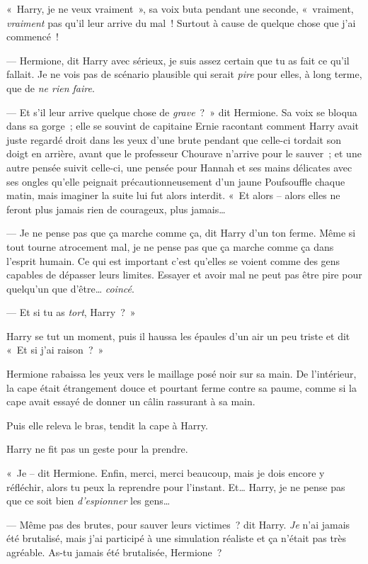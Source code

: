 «~Harry, je ne veux vraiment~», sa voix buta pendant une seconde, «~vraiment, \emph{vraiment} pas qu'il leur arrive du mal~! Surtout à cause de quelque chose que j'ai commencé~!

--- Hermione, dit Harry avec sérieux, je suis assez certain que tu as fait ce qu'il fallait. Je ne vois pas de scénario plausible qui serait \emph{pire} pour elles, à long terme, que de \emph{ne rien faire}.

--- Et s'il leur arrive quelque chose de \emph{grave}~?~» dit Hermione. Sa voix se bloqua dans sa gorge~; elle se souvint de capitaine Ernie racontant comment Harry avait juste regardé droit dans les yeux d'une brute pendant que celle-ci tordait son doigt en arrière, avant que le professeur Chourave n'arrive pour le sauver~; et une autre pensée suivit celle-ci, une pensée pour Hannah et ses mains délicates avec ses ongles qu'elle peignait précautionneusement d'un jaune Poufsouffle chaque matin, mais imaginer la suite lui fut alors interdit. «~Et alors -- alors elles ne feront plus jamais rien de courageux, plus jamais…

--- Je ne pense pas que ça marche comme ça, dit Harry d'un ton ferme. Même si tout tourne atrocement mal, je ne pense pas que ça marche comme ça dans l'esprit humain. Ce qui est important c'est qu'elles se voient comme des gens capables de dépasser leurs limites. Essayer et avoir mal ne peut pas être pire pour quelqu'un que d'être… \emph{coincé}.

--- Et si tu as \emph{tort}, Harry~?~»

Harry se tut un moment, puis il haussa les épaules d'un air un peu triste et dit «~Et si j'ai raison~?~»

Hermione rabaissa les yeux vers le maillage posé noir sur sa main. De l'intérieur, la cape était étrangement douce et pourtant ferme contre sa paume, comme si la cape avait essayé de donner un câlin rassurant à sa main.

Puis elle releva le bras, tendit la cape à Harry.

Harry ne fit pas un geste pour la prendre.

«~Je -- dit Hermione. Enfin, merci, merci beaucoup, mais je dois encore y réfléchir, alors tu peux la reprendre pour l'instant. Et… Harry, je ne pense pas que ce soit bien \emph{d'espionner} les gens…

--- Même pas des brutes, pour sauver leurs victimes~? dit Harry. \emph{Je} n'ai jamais été brutalisé, mais j'ai participé à une simulation réaliste et ça n'était pas très agréable. As-tu jamais été brutalisée, Hermione~?

